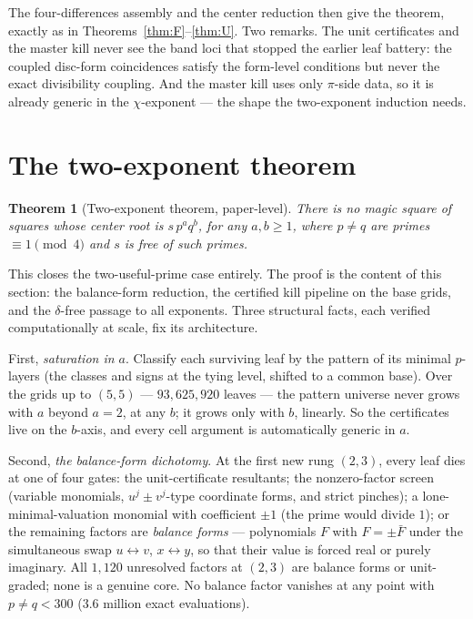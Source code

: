 \documentclass[11pt]{article}
\newtheorem{theorem}{Theorem}
\theoremstyle{remark}
\begin{document}
The four-differences assembly and the center reduction then give the theorem,
exactly as in Theorems~\ref{thm:F}--\ref{thm:U}.  Two remarks.  The unit
certificates and the master kill never see the band loci that stopped the
earlier leaf battery: the coupled disc-form coincidences satisfy the
form-level conditions but never the exact divisibility coupling.  And the
master kill uses only $\pi$-side data, so it is already generic in the
$\chi$-exponent — the shape the two-exponent induction needs.

\section{The two-exponent theorem}

\begin{theorem}[Two-exponent theorem, paper-level]\label{thm:AB}
There is no magic square of squares whose center root is $s\,p^aq^b$, for
any $a,b\ge1$, where $p\neq q$ are primes $\equiv1\pmod4$ and $s$ is free
of such primes.
\end{theorem}

This closes the two-useful-prime case entirely.  The proof is the content
of this section: the balance-form reduction, the certified kill pipeline
on the base grids, and the $\delta$-free passage to all exponents.  Three structural facts, each verified
computationally at scale, fix its architecture.

First, \emph{saturation in $a$}.  Classify each surviving leaf by the pattern
of its minimal $p$-layers (the classes and signs at the tying level, shifted
to a common base).  Over the grids up to $(5,5)$ --- $93{,}625{,}920$ leaves
--- the pattern universe never grows with $a$ beyond $a=2$, at any $b$; it
grows only with $b$, linearly.  So the certificates live on the $b$-axis, and
every cell argument is automatically generic in $a$.

Second, \emph{the balance-form dichotomy}.  At the first new rung $(2,3)$,
every leaf dies at one of four gates: the unit-certificate resultants; the
nonzero-factor screen (variable monomials, $u^j\pm v^j$-type coordinate
forms, and strict pinches); a lone-minimal-valuation monomial with
coefficient $\pm1$ (the prime would divide $1$); or the remaining factors are
\emph{balance forms} --- polynomials $F$ with $F=\pm\bar F$ under the
simultaneous swap $u\leftrightarrow v$, $x\leftrightarrow y$, so that their
value is forced real or purely imaginary.  All $1{,}120$ unresolved factors
at $(2,3)$ are balance forms or unit-graded; none is a genuine core.  No
balance factor vanishes at any point with $p\neq q<300$ ($3.6$ million exact
evaluations).
\end{document}
